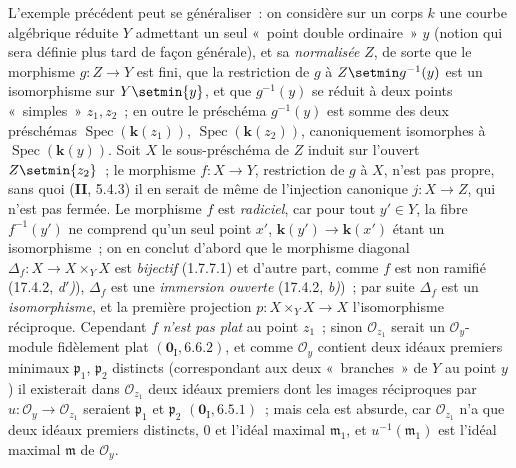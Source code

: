 \begin{env}[11.7.3]
\label{IV.11.7.3-fr}
L'exemple précédent peut se généraliser~: on considère sur un corps $k$ une
courbe algébrique réduite $Y$ admettant un seul «~point double ordinaire~» $y$
(notion qui sera définie plus tard de façon générale), et sa \emph{normalisée} $Z$, de
sorte que le morphisme $g:Z\to Y$ est fini, que la restriction de $g$ à
$Z\setmin g^{-1}(y)$ est un isomorphisme sur $Y\setmin\{y\}$, et que $g^{-1}(y)$ se réduit à
deux points «~simples~» $z_1,z_2$~; en outre le préschéma $g^{-1}(y)$ est somme
des deux préschémas $\operatorname{Spec}(\boldsymbol{k}(z_1))$,
$\operatorname{Spec}(\boldsymbol{k}(z_2))$, canoniquement isomorphes à
$\operatorname{Spec}(\boldsymbol{k}(y))$. Soit $X$ le sous-préschéma de $Z$ induit sur
l'ouvert $Z\setmin\{z_2\}$~; le morphisme $f:X\to Y$, restriction de $g$ à $X$, n'est
pas propre, sans quoi (\textbf{II}, 5.4.3) il en serait de même de l'injection
canonique $j:X\to Z$, qui n'est pas fermée. Le morphisme $f$ est \emph{radiciel}, car
pour tout $y'\in Y$, la fibre $f^{-1}(y')$ ne comprend qu'un seul point $x'$,
$\boldsymbol{k}(y')\to\boldsymbol{k}(x')$ étant un isomorphisme~; on en conclut d'abord que le morphisme
diagonal $\Delta_f:X\to X\times_Y X$ est \emph{bijectif} (1.7.7.1) et d'autre part,
comme $f$ est non ramifié (17.4.2, \emph{d$'$)}), $\Delta_f$ est une \emph{immersion ouverte}
(17.4.2, \emph{b)})~; par suite $\Delta_f$ est un \emph{isomorphisme}, et la première
projection $p:X\times_Y X\to X$ l'isomorphisme réciproque. Cependant $f$ \emph{n'est
pas plat} au point $z_1$~; sinon $\mathcal O_{z_1}$ serait un
$\mathcal O_y$-module fidèlement plat $(\mathbf 0_{\mathrm I},6.6.2)$, et comme
$\mathcal O_y$ contient deux idéaux premiers minimaux $\mathfrak p_1$,
$\mathfrak p_2$ distincts (correspondant aux deux «~branches~» de $Y$ au point
$y$) il existerait dans $\mathcal O_{z_1}$ deux idéaux premiers dont les images
réciproques par $u:\mathcal O_y\to\mathcal O_{z_1}$ seraient
$\mathfrak p_1$ et $\mathfrak p_2$ $(\mathbf 0_{\mathrm I},6.5.1)$~; mais cela
est absurde, car $\mathcal O_{z_1}$ n'a que deux idéaux premiers distincts, $0$
et l'idéal maximal $\mathfrak m_1$, et $u^{-1}(\mathfrak m_1)$ est l'idéal
maximal $\mathfrak m$ de $\mathcal O_y$.
\end{env}


